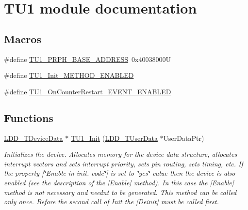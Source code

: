 \hypertarget{group___t_u1__module}{}\section{T\+U1 module documentation}
\label{group___t_u1__module}
\subsection*{Macros}
\begin{DoxyCompactItemize}
\item 
\#define \hyperlink{group___t_u1__module_ga791d7a56f94f745b0dbb9a0ff09ee0d4}{T\+U1\+\_\+\+P\+R\+P\+H\+\_\+\+B\+A\+S\+E\+\_\+\+A\+D\+D\+R\+E\+SS}~0x40038000U
\item 
\#define \hyperlink{group___t_u1__module_ga2532ba47f579738a2f954e79d2d99e9d}{T\+U1\+\_\+\+Init\+\_\+\+M\+E\+T\+H\+O\+D\+\_\+\+E\+N\+A\+B\+L\+ED}
\item 
\#define \hyperlink{group___t_u1__module_ga776fe3d89696e57b98cf36b71dbcc86c}{T\+U1\+\_\+\+On\+Counter\+Restart\+\_\+\+E\+V\+E\+N\+T\+\_\+\+E\+N\+A\+B\+L\+ED}
\end{DoxyCompactItemize}
\subsection*{Functions}
\begin{DoxyCompactItemize}
\item 
\hyperlink{group___p_e___types__module_gac5cf1362f1f0e3a2ce71b1bf2276d091}{L\+D\+D\+\_\+\+T\+Device\+Data} $\ast$ \hyperlink{group___t_u1__module_ga9bfbdf45fe9128c8d9e4245e3480d6da}{T\+U1\+\_\+\+Init} (\hyperlink{group___p_e___types__module_ga0b66a73f87238a782318aa0be7578e35}{L\+D\+D\+\_\+\+T\+User\+Data} $\ast$User\+Data\+Ptr)
\begin{DoxyCompactList}\small\item\em Initializes the device. Allocates memory for the device data structure, allocates interrupt vectors and sets interrupt priority, sets pin routing, sets timing, etc. If the property \mbox{[}\char`\"{}\+Enable in init. code\char`\"{}\mbox{]} is set to \char`\"{}yes\char`\"{} value then the device is also enabled (see the description of the \mbox{[}Enable\mbox{]} method). In this case the \mbox{[}Enable\mbox{]} method is not necessary and needn\textquotesingle{}t to be generated. This method can be called only once. Before the second call of Init the \mbox{[}Deinit\mbox{]} must be called first. \end{DoxyCompactList}\end{DoxyCompactItemize}


